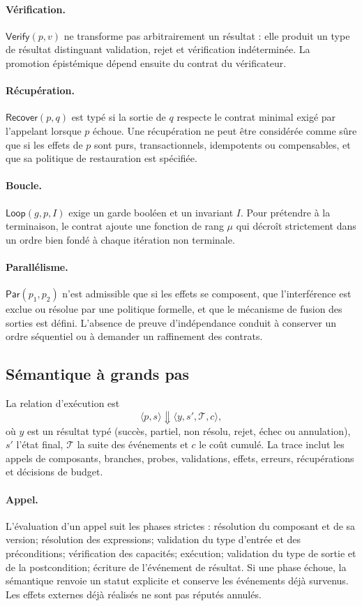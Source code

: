\documentclass[11pt,a4paper]{article}
\newcommand{\trace}{\mathcal{T}}
\theoremstyle{definition}
\theoremstyle{plain}
\theoremstyle{remark}
\begin{document}
\paragraph{Vérification.} $\mathsf{Verify}(p,v)$ ne transforme pas arbitrairement un résultat : elle produit un type de résultat distinguant validation, rejet et vérification indéterminée. La promotion épistémique dépend ensuite du contrat du vérificateur.
\paragraph{Récupération.} $\mathsf{Recover}(p,q)$ est typé si la sortie de $q$ respecte le contrat minimal exigé par l'appelant lorsque $p$ échoue. Une récupération ne peut être considérée comme sûre que si les effets de $p$ sont purs, transactionnels, idempotents ou compensables, et que sa politique de restauration est spécifiée.
\paragraph{Boucle.} $\mathsf{Loop}(g,p,I)$ exige un garde booléen et un invariant $I$. Pour prétendre à la terminaison, le contrat ajoute une fonction de rang $\mu$ qui décroît strictement dans un ordre bien fondé à chaque itération non terminale.
\paragraph{Parallélisme.} $\mathsf{Par}(p_1,p_2)$ n'est admissible que si les effets se composent, que l'interférence est exclue ou résolue par une politique formelle, et que le mécanisme de fusion des sorties est défini. L'absence de preuve d'indépendance conduit à conserver un ordre séquentiel ou à demander un raffinement des contrats.

\subsection{Sémantique à grands pas}
La relation d'exécution est
\[
\langle p,s\rangle\Downarrow\langle y,s',\trace,c\rangle,
\]
où $y$ est un résultat typé (succès, partiel, non résolu, rejet, échec ou annulation), $s'$ l'état final, $\trace$ la suite des événements et $c$ le coût cumulé. La trace inclut les appels de composants, branches, probes, validations, effets, erreurs, récupérations et décisions de budget.

\paragraph{Appel.} L'évaluation d'un appel suit les phases strictes : résolution du composant et de sa version; résolution des expressions; validation du type d'entrée et des préconditions; vérification des capacités; exécution; validation du type de sortie et de la postcondition; écriture de l'événement de résultat. Si une phase échoue, la sémantique renvoie un statut explicite et conserve les événements déjà survenus. Les effets externes déjà réalisés ne sont pas réputés annulés.
\end{document}
